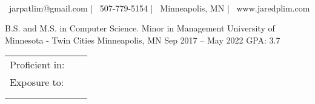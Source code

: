 \documentclass[]{awesome-cv}
\begin{document}
    
\begin{center}
	  \\
	\vspace{2mm}
	{\faEnvelope\ jarpatlim@gmail.com} | {\faMobile\ 507-779-5154} | {\faMapMarker\ Minneapolis, MN} | 
	{\faGlobe\ www.jaredplim.com}
\end{center}
\begin{cventries}
	\cventry
	{B.S. and M.S. in Computer Science. Minor in Management}
	{University of Minnesota - Twin Cities}
	{Minneapolis, MN}
	{Sep 2017 – May 2022}
	{GPA: 3.7}
\end{cventries}

\vspace{-2mm}
\begin{cventries}
	\vspace{-3mm}
	\cventry
	{}
	{\def\arraystretch{1.50}{\begin{tabular}{ l l }
	    Proficient in: \  & {\skill{Python, Java, C++, C, Git}} \\
		Exposure to:  & {\skill{Django, Spring Boot, AWS, Kubernetes, Docker, Drone, Gitlab, Jira, Azure DevOps, Oracle, Ansible, }} \\
		& {\skill{Vue.js, React, Node.js, Express.js, MongoDB, .NET Core, Groovy, Kotlin, Spock, Flask, Click, OCaml}}\\
		& {\skill{SQL, TypeScript/JavaScript, HTML/CSS, JUnit, Unix Programming}}\\
		\end{tabular}}}
	{}
	{}
	{}
\end{cventries}
\end{document}

